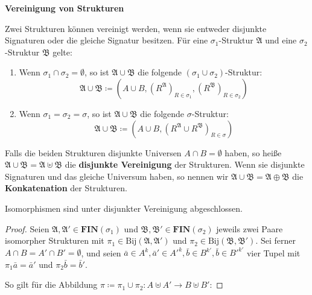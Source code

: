 %
\begin{defn}
\textbf{\label{def:disjoint-union}Vereinigung von Strukturen}

Zwei Strukturen können vereinigt werden, wenn sie entweder disjunkte
Signaturen oder die gleiche Signatur besitzen. Für eine $\sigma_{1}$-Struktur
$\mathfrak{A}$ und eine $\sigma_{2}$-Struktur $\mathfrak{B}$ gelte:

\end{defn}
\begin{enumerate}
\item Wenn $\sigma_{1}\cap\sigma_{2}=\emptyset$, so ist $\mathfrak{A}\cup\mathfrak{B}$
die folgende $\left(\sigma_{1}\cup\sigma_{2}\right)$-Struktur:
\[
\mathfrak{A}\cup\mathfrak{B}\coloneqq\left(A\cup B,\left(R^{\mathfrak{A}}\right)_{R\in\sigma_{1}},\left(R^{\mathfrak{B}}\right)_{R\in\sigma_{2}}\right)
\]
\item Wenn $\sigma_{1}=\sigma_{2}=\sigma$, so ist $\mathfrak{A}\cup\mathfrak{B}$
die folgende $\sigma$-Struktur:
\[
\mathfrak{A}\cup\mathfrak{B}\coloneqq\left(A\cup B,\left(R^{\mathfrak{A}}\cup R^{\mathfrak{B}}\right)_{R\in\sigma}\right)
\]
\end{enumerate}
\begin{defn}
Falls die beiden Strukturen disjunkte Universen $A\cap B=\emptyset$
haben, so heiße $\mathfrak{A}\cup\mathfrak{B}=\mathfrak{A}\uplus\mathfrak{B}$
die \textbf{disjunkte Vereinigung} der Strukturen. Wenn sie disjunkte
Signaturen und das gleiche Universum haben, so nennen wir $\mathfrak{A}\cup\mathfrak{B}=\mathfrak{A}\oplus\mathfrak{B}$
die \textbf{Konkatenation} der Strukturen.
\end{defn}
\begin{prop}
\label{prop:iso-closed-disjoint}Isomorphismen sind unter disjunkter
Vereinigung abgeschlossen.
\end{prop}
\begin{proof}
Seien $\mathfrak{A},\mathfrak{A}'\in\mathbf{FIN}\left(\sigma_{1}\right)$
und $\mathfrak{B},\mathfrak{B}'\in\mathbf{FIN}\left(\sigma_{2}\right)$
jeweils zwei Paare isomorpher Strukturen mit $\pi_{1}\in\mathrm{Bij}\left(\mathfrak{A},\mathfrak{A}'\right)$
und $\pi_{2}\in\mathrm{Bij}\left(\mathfrak{B},\mathfrak{B}'\right)$.
Sei ferner $A\cap B=A'\cap B'=\emptyset$, und seien $\bar{a}\in A^{k},\bar{a}'\in A'^{k},\bar{b}\in B^{k'},\bar{b}\in B'^{k'}$
vier Tupel mit $\pi_{1}\bar{a}=\bar{a}'$ und $\pi_{2}\bar{b}=\bar{b}'$.

So gilt für die Abbildung $\pi\coloneqq\pi_{1}\cup\pi_{2}:A\uplus A'\rightarrow B\uplus B'$:

\end{proof}
